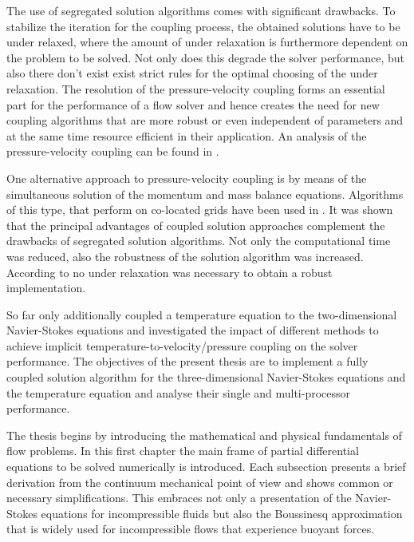 The use of segregated solution algorithms comes with significant drawbacks. To stabilize the iteration for the coupling process, the obtained solutions have to be under relaxed, where the amount of under relaxation is furthermore dependent on the problem to be solved. Not only does this degrade the solver performance, but also there don't exist exist strict rules for the optimal choosing of the under relaxation. The resolution of the pressure-velocity coupling forms an essential part for the performance of a flow solver and hence creates the need for new coupling algorithms that are more robust or even independent of parameters and at the same time resource efficient in their application. An analysis of the pressure-velocity coupling can be found in \cite{peric90}.

One alternative approach to pressure-velocity coupling is by means of the simultaneous solution of the momentum and mass balance equations. Algorithms of this type, that perform on co-located grids have been used in \cite{chen10,darwish09,falk13,galpin86,klaij13,mangani14,vakilipour12}. It was shown that the principal advantages of coupled solution approaches complement the drawbacks of segregated solution algorithms. Not only the computational time was reduced, also the robustness of the solution algorithm was increased. According to \cite{darwish09} no under relaxation was necessary to obtain a robust implementation. 

So far only \cite{galpin86,vakilipour12} additionally coupled a temperature equation to the two-dimensional Navier-Stokes equations and investigated the impact of different methods to achieve implicit temperature-to-velocity/pressure coupling on the solver performance. The objectives of the present thesis are to implement a fully coupled solution algorithm for the three-dimensional Navier-Stokes equations and the temperature equation and analyse their single and multi-processor performance.

The thesis begins by introducing the mathematical and physical fundamentals of flow problems. In this first chapter the main frame of partial differential equations to be solved numerically is introduced. Each subsection presents a brief derivation from the continuum mechanical point of view and shows common or necessary simplifications. This embraces not only a presentation of the Navier-Stokes equations for incompressible fluids but also the Boussinesq approximation that is widely used for incompressible flows that experience buoyant forces.

